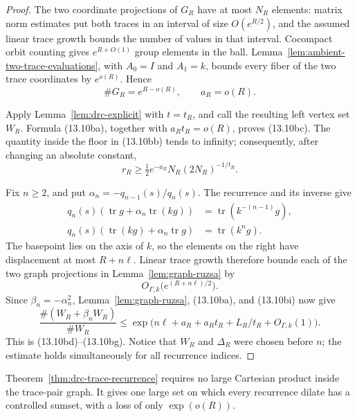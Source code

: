 \documentclass[11pt,reqno]{amsart}
\theoremstyle{definition}
\theoremstyle{remark}
\newcommand{\Tr}{\operatorname{tr}}
\begin{document}
\begin{proof}
The two coordinate projections of \(G_R\) have at most \(N_R\) elements:
matrix norm estimates put both traces in an interval of size \(O(e^{R/2})\),
and the assumed linear trace growth bounds the number of values in that
interval.  Cocompact orbit counting gives \(e^{R+O(1)}\) group elements in
the ball.  Lemma~\ref{lem:ambient-two-trace-evaluations}, with
\(A_0=I\) and \(A_1=k\), bounds every fiber of the two trace coordinates
by \(e^{o(R)}\).  Hence
\[
 \#G_R=e^{R-o(R)},
 \qquad a_R=o(R).
\tag{13.10bh}
\]

Apply Lemma~\ref{lem:drc-explicit} with \(t=t_R\), and call the resulting
left vertex set \(W_R\).  Formula (13.10ba), together with
\(a_Rt_R=o(R)\), proves (13.10bc).  The quantity inside the floor in
(13.10bb) tends to infinity; consequently, after changing an absolute
constant,
\[
 r_R\ge
 \tfrac12 e^{-a_R}N_R(2N_R)^{-1/t_R}.
\tag{13.10bi}
\]

Fix \(n\ge2\), and put \(\alpha_n=-q_{n-1}(s)/q_n(s)\).  The recurrence
and its inverse give
\[
 \begin{aligned}
 q_n(s)(\Tr g+\alpha_n\Tr(kg))
   &=\Tr(k^{-(n-1)}g),\\
 q_n(s)(\Tr(kg)+\alpha_n\Tr g)
   &=\Tr(k^ng).
 \end{aligned}
\tag{13.10bj}
\]
The basepoint lies on the axis of \(k\), so the elements on the right have
displacement at most \(R+n\ell\).  Linear trace growth therefore bounds
each of the two graph projections in Lemma~\ref{lem:graph-ruzsa} by
\[
 O_{\Gamma,k}\bigl(e^{(R+n\ell)/2}\bigr).
\tag{13.10bk}
\]
Since \(\beta_n=-\alpha_n^2\), Lemma~\ref{lem:graph-ruzsa}, (13.10ba),
and (13.10bi) now give
\[
 \frac{\#(W_R+\beta_nW_R)}{\#W_R}
 \le
 \exp\bigl(n\ell+a_R+a_Rt_R+L_R/t_R+O_{\Gamma,k}(1)\bigr).
\]
This is (13.10bd)--(13.10bg).  Notice that \(W_R\) and \(\Delta_R\) were
chosen before \(n\); the estimate holds simultaneously for all
recurrence indices.
\end{proof}

Theorem~\ref{thm:drc-trace-recurrence} requires no large Cartesian product
inside the trace-pair graph.  It gives one large set on which every
recurrence dilate has a controlled sumset, with a loss of only
\(\exp(o(R))\).
\end{document}
